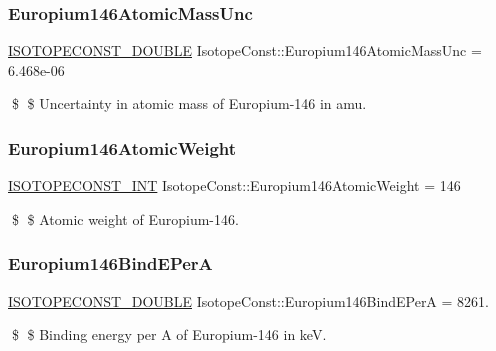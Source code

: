 \subsubsection{\texorpdfstring{Europium146\+Atomic\+Mass\+Unc}{Europium146AtomicMassUnc}}
{\footnotesize\ttfamily \mbox{\hyperlink{group___isotope_const-_macros_ga8f45a7272ce02c0b4c65c44636ed719a}{I\+S\+O\+T\+O\+P\+E\+C\+O\+N\+S\+T\+\_\+\+D\+O\+U\+B\+LE}} Isotope\+Const\+::\+Europium146\+Atomic\+Mass\+Unc = 6.\+468e-\/06}

\$ \$ Uncertainty in atomic mass of Europium-\/146 in amu. \mbox{\label{group___isotope_const-_europium-_eu146_gaf0e06be623e920b97e47bb41760c42f1}} 
\subsubsection{\texorpdfstring{Europium146\+Atomic\+Weight}{Europium146AtomicWeight}}
{\footnotesize\ttfamily \mbox{\hyperlink{group___isotope_const-_macros_ga5f18360b3e99483a35c32d789e62621c}{I\+S\+O\+T\+O\+P\+E\+C\+O\+N\+S\+T\+\_\+\+I\+NT}} Isotope\+Const\+::\+Europium146\+Atomic\+Weight = 146}

\$ \$ Atomic weight of Europium-\/146. \mbox{\label{group___isotope_const-_europium-_eu146_ga081dae881bdefa9f63581c892cf10b44}} 
\subsubsection{\texorpdfstring{Europium146\+Bind\+E\+PerA}{Europium146BindEPerA}}
{\footnotesize\ttfamily \mbox{\hyperlink{group___isotope_const-_macros_ga8f45a7272ce02c0b4c65c44636ed719a}{I\+S\+O\+T\+O\+P\+E\+C\+O\+N\+S\+T\+\_\+\+D\+O\+U\+B\+LE}} Isotope\+Const\+::\+Europium146\+Bind\+E\+PerA = 8261.}

\$ \$ Binding energy per A of Europium-\/146 in keV. \mbox{\label{group___isotope_const-_europium-_eu146_gaea302763b6c5a2e46e8bfc750160074f}} 
